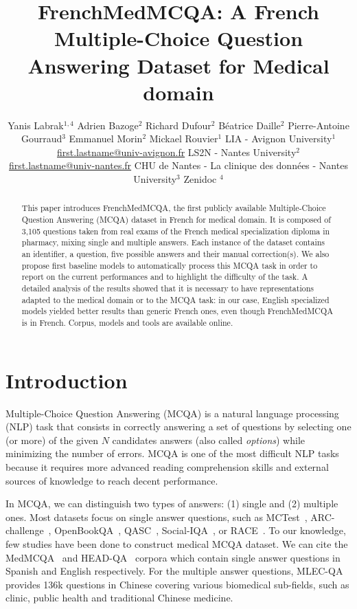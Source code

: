 \documentclass[11pt]{article}
\title{FrenchMedMCQA: A French Multiple-Choice Question Answering Dataset for Medical domain}
\author{
Yanis Labrak$^{1,4}$
\And Adrien Bazoge$^{2}$
\And Richard Dufour$^{2}$
\And Béatrice Daille$^{2}$
\AND Pierre-Antoine Gourraud$^{3}$
\And Emmanuel Morin$^{2}$
\And Mickael Rouvier$^{1}$
\AND \textnormal{\large LIA - Avignon University$^{1}$}\\\normalsize{\url{first.lastname@univ-avignon.fr}}
\And \textnormal{\large LS2N - Nantes University$^{2}$}\\\normalsize{\url{first.lastname@univ-nantes.fr}}
\AND \textnormal{\large CHU de Nantes - La clinique des données - Nantes University$^{3}$}
\And \textnormal{\large Zenidoc $^{4}$}\\
}
\begin{document}
\maketitle
\begin{abstract}
This paper introduces FrenchMedMCQA, the first publicly available Multiple-Choice Question Answering (MCQA) dataset in French for medical domain. It is composed of 3,105 questions taken from real exams of the French medical specialization diploma in pharmacy, mixing  single  and multiple answers.
Each instance of the dataset contains an identifier, a question, five possible answers and their manual correction(s). 
We also propose first baseline models to automatically process this MCQA task in order to report on the current performances and to highlight the difficulty of the task. A detailed analysis of the results showed that it is necessary to have representations adapted to the medical domain or to the MCQA task: in our case, English specialized models yielded better results than generic French ones, even though FrenchMedMCQA is in French. Corpus, models and tools are available online.
\end{abstract}

\section{Introduction}









Multiple-Choice Question Answering (MCQA) is a natural language processing (NLP) task that consists in correctly answering a set of questions by selecting one (or more) of the given $N$ candidates answers (also called {\it options}) while minimizing the number of errors. MCQA is one of the most difficult NLP tasks because it requires more advanced reading comprehension skills and external sources of knowledge to reach decent performance.



In MCQA, we can distinguish two types of answers: (1) single and (2) multiple ones. Most datasets focus on single answer questions, such as MCTest~\cite{richardson-etal-2013-mctest}, ARC-challenge~\cite{Clark2018ThinkYH}, OpenBookQA~\cite{OpenBookQA2018}, QASC~\cite{https://doi.org/10.48550/arxiv.1910.11473}, Social-IQA~\cite{https://doi.org/10.48550/arxiv.1904.09728}, or RACE~\cite{lai-etal-2017-race}.
To our knowledge, few studies have been done to construct medical MCQA dataset. We can cite the MedMCQA~\cite{pmlr-v174-pal22a} and HEAD-QA~\cite{vilares-gomez-rodriguez-2019-head} corpora which contain single answer questions in Spanish and English respectively. For the multiple answer questions, MLEC-QA~\cite{li-etal-2021-mlec} provides 136k questions in Chinese covering various biomedical sub-fields, such as clinic, public health and traditional Chinese medicine.
\end{document}
